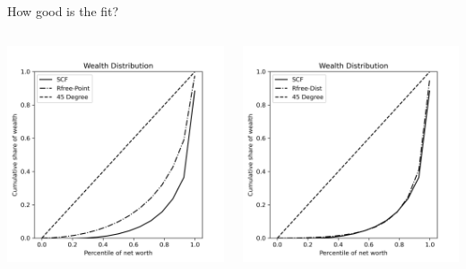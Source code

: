 \documentclass{beamer}
\begin{document}
\begin{frame}{How good is the fit?}
 \begin{columns}
    \centering
    \includegraphics[width=\textwidth]{Figures/LCrrPointNetWorthPlot.png}
    
    \centering
    \includegraphics[width=\textwidth]{Figures/LCrrDistNetWorthPlot.png}

  \end{columns}
\end{frame}
\end{document}
